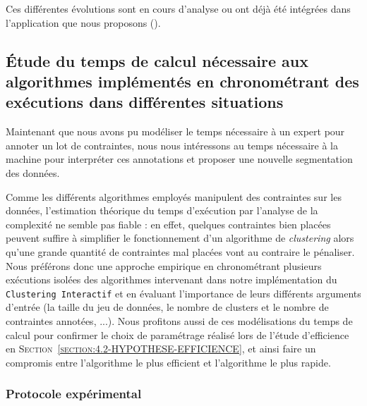 			\begin{leftBarInformation}
				Ces différentes évolutions sont en cours d'analyse ou ont déjà été intégrées dans l'application que nous proposons (\cite{schild-etal:2022:cognitivefactory-interactiveclusteringgui}).
			\end{leftBarInformation}
	

	\subsection{Étude du temps de calcul nécessaire aux algorithmes implémentés en chronométrant des exécutions dans différentes situations}
	\label{section:4.3.2-ETUDE-COUTS-TEMPS-CALCUL}
		
		Maintenant que nous avons pu modéliser le temps nécessaire à un expert pour annoter un lot de contraintes, nous nous intéressons au temps nécessaire à la machine pour interpréter ces annotations et proposer une nouvelle segmentation des données.
		
		Comme les différents algorithmes employés manipulent des contraintes sur les données, l'estimation théorique du temps d'exécution par l'analyse de la complexité ne semble pas fiable : en effet, quelques contraintes bien placées peuvent suffire à simplifier le fonctionnement d'un algorithme de \textit{clustering} alors qu'une grande quantité de contraintes mal placées vont au contraire le pénaliser.
		Nous préférons donc une approche empirique en chronométrant plusieurs exécutions isolées des algorithmes intervenant dans notre implémentation du \texttt{Clustering Interactif} et en évaluant l'importance de leurs différents arguments d'entrée (la taille du jeu de données, le nombre de clusters et le nombre de contraintes annotées, ...).
		Nous profitons aussi de ces modélisations du temps de calcul pour confirmer le choix de paramétrage réalisé lors de l'étude d'efficience en \textsc{Section~\ref{section:4.2-HYPOTHESE-EFFICIENCE}}, et ainsi faire un compromis entre l'algorithme le plus efficient et l'algorithme le plus rapide.
	
		\subsubsection{Protocole expérimental}
			

